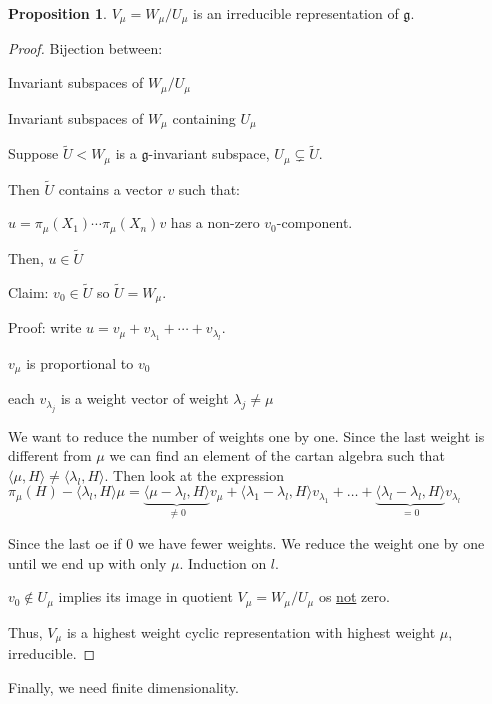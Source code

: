 \documentclass{article}
\theoremstyle{definition}
\newtheorem{proposition}{Proposition}
\begin{document}
\begin{proposition}
    \(V_\mu = W_\mu / U_\mu\) is an irreducible representation of \(\mathfrak{g}\). 
\end{proposition}

\begin{proof}
    Bijection between:

    Invariant subspaces of \(W_\mu / U_\mu\)
    
    Invariant subspaces of \(W_\mu\) containing \(U_\mu\) 

    Suppose \(\tilde{U} < W_\mu\) is a \(\mathfrak{g}\)-invariant subspace, \(U_\mu \subsetneq \tilde{U}\).

    Then \(\tilde{U}\) contains a vector \(v\) such that:

    \(u = \pi_\mu(X_1)\cdots\pi_\mu(X_n)v\) has a non-zero \(v_0\)-component.
    
    Then, \(u\in\tilde{U}\) 
    
    Claim: \(v_0\in\tilde{U}\) so \(\tilde{U} = W_\mu\).

    Proof: write \(u = v_\mu + v_{\lambda_1}+\cdots+v_{\lambda_l}\).

    \(v_\mu\) is proportional to \(v_0\) 

    each \(v_{\lambda_j}\) is a weight vector of weight \(\lambda_j \neq \mu\) 

    We want to reduce the number of weights one by one. Since the last weight is different from \(\mu\) we can find an element of the cartan algebra such that \(\langle \mu, H \rangle \neq \langle \lambda_l, H \rangle \). Then look at the expression \(\pi_\mu(H) - \langle \lambda_l, H \rangle \mu = \underbrace{\langle \mu - \lambda_l, H \rangle}_{\neq 0} v_\mu + \langle \lambda_1 - \lambda_l, H \rangle v_{\lambda_1} + \dots + \underbrace{\langle \lambda_l - \lambda_l, H \rangle}_{=0} v_{\lambda_l}\)  

    Since the last oe if \(0\) we have fewer weights. We reduce the weight one by one until we end up with only \(\mu\). Induction on \(l\).

    \(v_0\notin U_\mu\) implies its image in quotient \(V_\mu = W_\mu / U_\mu\) os \underline{not} zero.

    Thus, \(V_\mu\) is a highest weight cyclic representation with highest weight \(\mu\), irreducible.

\end{proof}

Finally, we need finite dimensionality.
\end{document}
